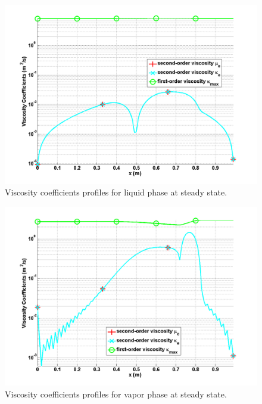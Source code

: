 \begin{figure}[H]
\centering
\includegraphics[width=\textwidth]{figures/SEM/Aint1e4_liquid_viscosity_kappa_mu.png}
\caption{Viscosity coefficients profiles for liquid phase at steady state.}
\label{fig:two-fluids-rel-nozzle-visc-liq-sem-sect4}
\end{figure}
%
\begin{figure}[H]
\centering
\includegraphics[width=\textwidth]{figures/SEM/Aint1e4_vapor_viscosity_kappa_mu.png}
\caption{Viscosity coefficients profiles for vapor phase at steady state.}
\label{fig:two-fluids-rel-nozzle-visc-vap-sem-sect4}
\end{figure}
%
